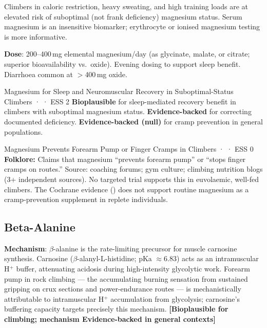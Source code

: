 Climbers in caloric restriction, heavy sweating, and high training loads are at elevated risk of suboptimal (not frank deficiency) magnesium status. Serum magnesium is an insensitive biomarker; erythrocyte or ionised magnesium testing is more informative.

\textbf{Dose}: 200--400\,mg elemental magnesium/day (as glycinate, malate, or citrate; superior bioavailability vs.\ oxide). Evening dosing to support sleep benefit. Diarrhoea common at $>$400\,mg oxide.

\begin{bioplausbox}{Magnesium for Sleep and Neuromuscular Recovery in Suboptimal-Status Climbers · \bioplausible · ESS 2}
\textbf{Bioplausible} for sleep-mediated recovery benefit in climbers with suboptimal magnesium status. \textbf{Evidence-backed} for correcting documented deficiency. \textbf{Evidence-backed (null)} for cramp prevention in general populations.
\end{bioplausbox}

\begin{folklorebox}{Magnesium Prevents Forearm Pump or Finger Cramps in Climbers · \folkloreverified · ESS 0}
\textbf{Folklore:} Claims that magnesium ``prevents forearm pump'' or ``stops finger cramps on routes.'' Source: coaching forums; gym culture; climbing nutrition blogs (3+ independent sources). No targeted trial supports this in euvolaemic, well-fed climbers. The Cochrane evidence (\cite{GKK+20}) does not support routine magnesium as a cramp-prevention supplement in replete individuals.
\end{folklorebox}

\subsection{Beta-Alanine}
\label{subsec:betaalanine}

\textbf{Mechanism}: $\beta$-alanine is the rate-limiting precursor for muscle carnosine synthesis. Carnosine ($\beta$-alanyl-L-histidine; pKa ${\approx}$6.83) acts as an intramuscular H$^+$ buffer, attenuating acidosis during high-intensity glycolytic work. Forearm pump in rock climbing --- the accumulating burning sensation from sustained gripping on crux sections and power-endurance routes --- is mechanistically attributable to intramuscular H$^+$ accumulation from glycolysis; carnosine's buffering capacity targets precisely this mechanism. \textbf{[Bioplausible for climbing; mechanism Evidence-backed in general contexts]}

